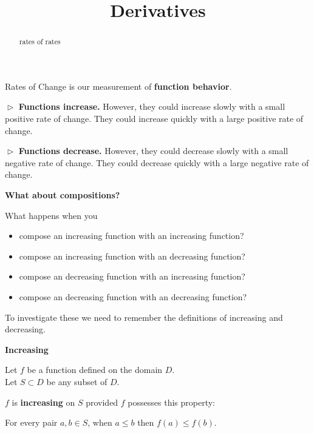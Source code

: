 \documentclass{ximera}
\title{Derivatives}
\begin{document}
\begin{abstract}
rates of rates
\end{abstract}
\maketitle




Rates of Change is our measurement of \textbf{function behavior}.




$\vartriangleright$  \textbf{\textcolor{blue!55!black}{Functions increase.}}  However, they could increase slowly with a small positive rate of change.  They could increase quickly with a large positive rate of change. 



$\vartriangleright$  \textbf{\textcolor{blue!55!black}{Functions decrease.}}  However, they could decrease slowly with a small negative rate of change.  They could decrease quickly with a large negative rate of change. 





\textbf{\textcolor{purple!85!blue}{What about compositions?}}





What happens when you


\begin{itemize}
\item compose an increasing function with an increasing function?
\item compose an increasing function with an decreasing function?
\item compose an decreasing function with an increasing function?
\item compose an decreasing function with an decreasing function?
\end{itemize}



To investigate these we need to remember the definitions of increasing and decreasing.






\begin{summary} \textbf{\textcolor{green!50!black}{Increasing}} 


Let $f$ be a function defined on the domain $D$. \\
Let $S \subset D$ be any subset of $D$.

$f$ is \textbf{increasing} on $S$ provided $f$ possesses this property:  


\begin{center}
For every pair $a, b \in S$, when $a \leq b$ then $f(a) \leq f(b)$.
\end{center}

\end{summary}
\end{document}
